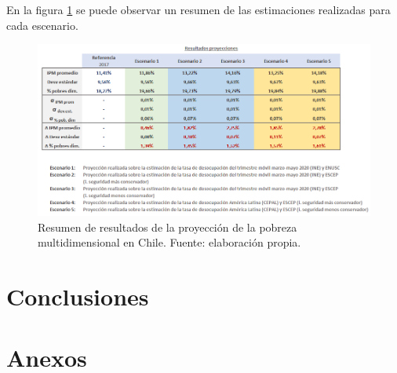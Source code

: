 \documentclass[12pt,letterpaper,spanish]{article}
\begin{document}
En la figura \ref{resumen_resultados_escenarios} se puede observar un resumen de las estimaciones realizadas para cada escenario. 






\begin{figure}[H]
    \centering
    \includegraphics[width=\textwidth]{Max/resultados_escenarios.png}
    \caption{Resumen de resultados de la proyección de la pobreza multidimensional en Chile. Fuente: elaboración propia.}
    \label{resumen_resultados_escenarios}
\end{figure}

















\newpage
\section{Conclusiones} %






\newpage
{}




\newpage
 \vspace*{\fill}
\section*{\centering Anexos}
 \vspace*{\fill}
\newpage
\end{document}

